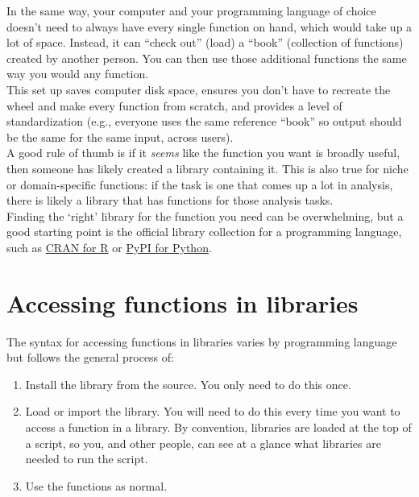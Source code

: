\documentclass[
]{book}
\providecommand{\tightlist}{%
  \setlength{\itemsep}{0pt}\setlength{\parskip}{0pt}}
\begin{document}
In the same way, your computer and your programming language of choice doesn't need to always have every single function on hand, which would take up a lot of space. Instead, it can ``check out'' (load) a ``book'' (collection of functions) created by another person. You can then use those additional functions the same way you would any function.\\

This set up saves computer disk space, ensures you don't have to recreate the wheel and make every function from scratch, and provides a level of standardization (e.g., everyone uses the same reference ``book'' so output should be the same for the same input, across users).\\

A good rule of thumb is if it \emph{seems} like the function you want is broadly useful, then someone has likely created a library containing it. This is also true for niche or domain-specific functions: if the task is one that comes up a lot in analysis, there is likely a library that has functions for those analysis tasks.\\

Finding the `right' library for the function you need can be overwhelming, but a good starting point is the official library collection for a programming language, such as \href{https://cran.r-project.org/web/views/}{CRAN for R} or \href{https://pypi.org/}{PyPI for Python}.

\section{Accessing functions in libraries}\label{accessing-functions-in-libraries}

The syntax for accessing functions in libraries varies by programming language but follows the general process of:

\begin{enumerate}
\def\labelenumi{\arabic{enumi}.}
\tightlist
\item
  Install the library from the source. You only need to do this once.
\item
  Load or import the library. You will need to do this every time you want to access a function in a library. By convention, libraries are loaded at the top of a script, so you, and other people, can see at a glance what libraries are needed to run the script.
\item
  Use the functions as normal.
\end{enumerate}
\end{document}
